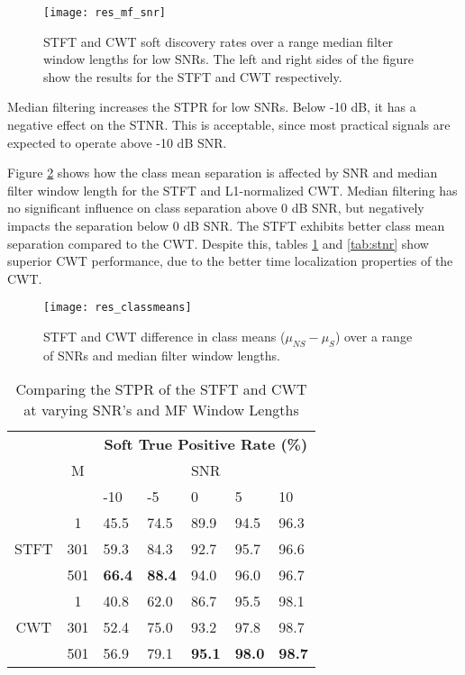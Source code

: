  \begin{figure}[h!]
	\centering
	\texttt{[image: res\_mf\_snr]}
	\caption{STFT and CWT soft discovery rates over a range median filter window lengths for low SNRs. The left and right sides of the figure show the results for the STFT and CWT respectively.}
	\label{fig:res_mf_snr}
\end{figure}

Median filtering increases the STPR for low SNRs. Below -10 dB, it has a negative effect on the STNR. This is acceptable, since most practical signals are expected to operate above -10 dB SNR.

Figure \ref{fig:res_classmeans} shows how the class mean separation is affected by SNR and median filter window length for the STFT and L1-normalized CWT. Median filtering has no significant influence on class separation above 0 dB SNR, but negatively impacts the separation below 0 dB SNR. The STFT exhibits better class mean separation compared to the CWT. Despite this, tables \ref{tab:stpr} and \ref{tab:stnr} show superior CWT performance, due to the better time localization properties of the CWT.

\begin{figure}[h!]
	\centering
	\texttt{[image: res\_classmeans]}
	\caption{STFT and CWT difference in class means ($\mu_{NS} - \mu_S$) over a range of SNRs and median filter window lengths.}
	\label{fig:res_classmeans}
\end{figure}

\begin{table}[h!]
	\caption{Comparing the STPR of the STFT and CWT at varying SNR's and MF Window Lengths\label{tab:stpr}}
	\centering
\begin{tabular}{cclllll}
\hline
	\multirow{3}{*}{} & \multicolumn{1}{c}{\multirow{3}{*}{M}} & \multicolumn{5}{c}{\textbf{Soft True Positive Rate (\%)}}                   \\
	& \multicolumn{1}{c}{} & \multicolumn{5}{c}{SNR}                  \\ \cline{3-7} 
	& \multicolumn{1}{c}{} & -10  & -5           & 0    & 5   & 10   \\ \hline
\multirow{3}{*}{STFT} & 1                    & 45.5          & 74.5          & 89.9          & 94.5          & 96.3          \\
& 301                  & 59.3          & 84.3          & 92.7          & 95.7          & 96.6          \\
& 501                  & \textbf{66.4} & \textbf{88.4} & 94.0          & 96.0          & 96.7          \\ \hline
\multirow{3}{*}{CWT}  & 1                    & 40.8          & 62.0          & 86.7          & 95.5          & 98.1          \\
& 301                  & 52.4          & 75.0          & 93.2          & 97.8          & 98.7          \\
& 501                  & 56.9          & 79.1          & \textbf{95.1} & \textbf{98.0} & \textbf{98.7} \\ \hline
\end{tabular}
\end{table}

